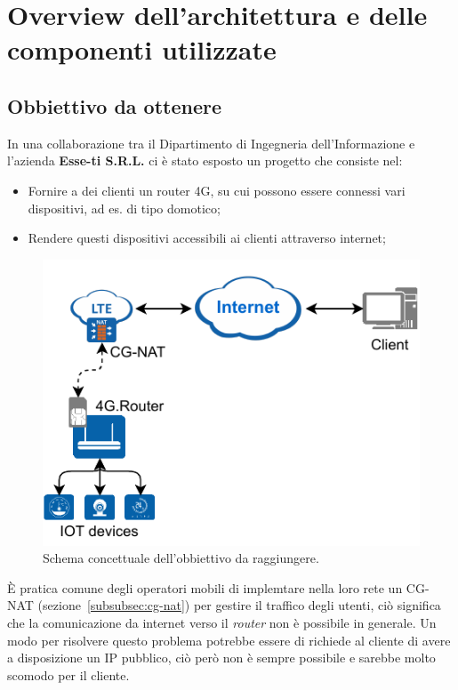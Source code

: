 

\chapter{Overview dell'architettura e delle componenti utilizzate \ok}

\label{ch:overview}

\section{Obbiettivo da ottenere \ok}
\label{sec:overview-goal}

In una collaborazione tra il Dipartimento di Ingegneria dell'Informazione e l'azienda \textbf{Esse-ti S.R.L.} ci è stato esposto un progetto che consiste nel:


\begin{itemize}[nosep, itemsep=0.2em]
	\item Fornire a dei clienti un router 4G, su cui possono essere connessi vari dispositivi, ad es. di tipo domotico;
	\item Rendere questi dispositivi accessibili ai clienti attraverso internet;
\end{itemize}

\begin{figure}[H]
	\centering
	\includegraphics[width=0.5\linewidth]{immagini/diag-goal}
	\caption{Schema concettuale dell'obbiettivo da raggiungere.}
	\label{fig:schema_concettuale}
\end{figure}

È pratica comune degli operatori mobili di implemtare nella loro rete un CG-NAT (sezione~\ref{subsubsec:cg-nat}) per gestire il traffico degli utenti, ciò significa che la comunicazione da internet verso il \textit{router} non è possibile in generale. Un modo per risolvere questo problema potrebbe essere di richiede al cliente di avere a disposizione un IP pubblico, ciò però non è sempre possibile e sarebbe molto scomodo per il cliente. 

